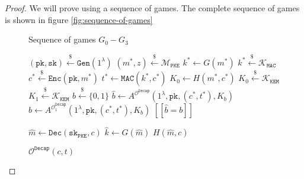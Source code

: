 \documentclass[floatrow,journal=tches,submission]{iacrtrans}
\newcommand{\monospace}{\texttt}
\newcommand{\pke}{\monospace{PKE}}
\newcommand{\keygen}{\monospace{Gen}}
\newcommand{\encrypt}{\monospace{Enc}}
\newcommand{\decrypt}{\monospace{Dec}}
\newcommand{\kem}{\monospace{KEM}}
\newcommand{\decap}{\monospace{Decap}}
\newcommand{\mac}{\monospace{MAC}}
\newcommand{\pk}{\monospace{pk}}
\newcommand{\sk}{\monospace{sk}}
\newcommand{\leftsample}{\stackrel{\$}{\leftarrow}}
\newcommand{\llbrack}{[\![}
\newcommand{\rrbrack}{]\!]}
\begin{document}
\begin{proof}
    We will prove using a sequence of games. The complete sequence of games is shown in figure \ref{fig:sequence-of-games}

    \begin{figure}[H]
        \center
        \begin{minipage}{0.55\textwidth}
            \begin{algorithm}[H]
                \caption{Sequence of games $G_0 - G_3$}\label{alg:sequence-of-games}
                \begin{algorithmic}[1]
                    \State $(\pk, \sk) \leftsample \keygen(1^\lambda)$
                    \State $(m^\ast, z) \leftsample \mathcal{M}_\pke$
                    \State $k^\ast \leftarrow G(m^\ast)$
                    \State $k^\ast \leftsample \mathcal{K}_\mac$
                    \State $c^\ast \leftsample \encrypt(\pk, m^\ast)$
                    \State $t^\ast \leftarrow \mac(k^\ast, c^\ast)$
                    \State $K_0 \leftarrow H(m^\ast, c^\ast)$
                    \State $K_0 \leftsample \mathcal{K}_\kem$
                    \State $K_1 \leftsample \mathcal{K}_\kem$
                    \State $b \leftsample \{0,1\}$
                    \State $\hat{b} \leftarrow A^{\mathcal{O}^\decap}(
                        1^\lambda, \pk, (c^\ast, t^\ast), K_b)$
                    \State $\hat{b} \leftarrow A^{\mathcal{O}^\decap_1}(
                        1^\lambda, \pk, (c^\ast, t^\ast), K_b)$
                    \State \Return $\llbrack \hat{b} = b \rrbrack$
                \end{algorithmic}
            \end{algorithm}
        \end{minipage}
        \hfill
        \begin{minipage}{0.4\textwidth}
            \begin{algorithm}[H]
                \caption{$\mathcal{O}^\decap(c, t)$}\label{alg:etm-decap-oracle}
                \begin{algorithmic}[1]
                    \State $\hat{m} \leftarrow \decrypt(\sk_\pke, c)$
                    \State $\hat{k} \leftarrow G(\hat{m})$
                    \If{$\mac(\hat{k}, c) = t$}
                        \State \Return $H(\hat{m}, c)$

\end{algorithmic}
\end{algorithm}
\end{minipage}
\end{figure}
\end{proof}
\end{document}
